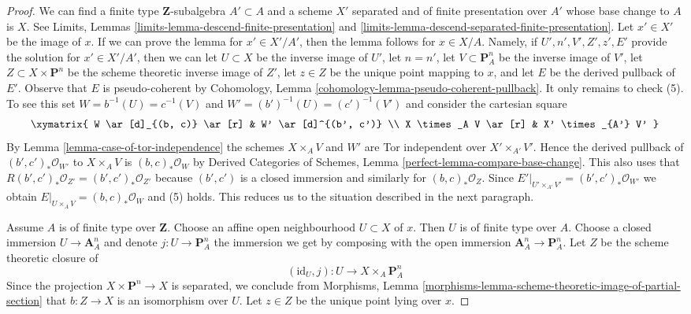\begin{proof}
We can find a finite type $\mathbf{Z}$-subalgebra $A' \subset A$
and a scheme $X'$ separated and of finite presentation over $A'$
whose base change to $A$ is $X$. See
Limits, Lemmas \ref{limits-lemma-descend-finite-presentation} and
\ref{limits-lemma-descend-separated-finite-presentation}.
Let $x' \in X'$ be the image of $x$.
If we can prove the lemma for $x' \in X'/A'$, then
the lemma follows for $x \in X/A$.
Namely, if $U', n', V', Z', z', E'$ provide the solution
for $x' \in X'/A'$, then we can let
$U \subset X$ be the inverse image of $U'$,
let $n = n'$,
let $V \subset \mathbf{P}^n_A$ be the inverse image of $V'$,
let $Z \subset X \times \mathbf{P}^n$ be
the scheme theoretic inverse image of $Z'$,
let $z \in Z$ be the unique point mapping to $x$, and
let $E$ be the derived pullback of $E'$.
Observe that $E$ is pseudo-coherent by
Cohomology, Lemma \ref{cohomology-lemma-pseudo-coherent-pullback}.
It only remains to check (5). To see this
set $W = b^{-1}(U) = c^{-1}(V)$ and $W' = (b')^{-1}(U) = (c')^{-1}(V')$ 
and consider the cartesian square
$$
\xymatrix{
W \ar[d]_{(b, c)} \ar[r] & W' \ar[d]^{(b', c')} \\
X \times_A V \ar[r] & X' \times_{A'} V'
}
$$
By Lemma \ref{lemma-case-of-tor-independence} the schemes
$X \times_A V$ and $W'$ are Tor independent over $X' \times_{A'} V'$.
Hence the derived pullback of
$(b', c')_*\mathcal{O}_{W'}$ to $X \times_A V$
is $(b, c)_*\mathcal{O}_W$ by
Derived Categories of Schemes,
Lemma \ref{perfect-lemma-compare-base-change}.
This also uses that $R(b', c')_*\mathcal{O}_{Z'} = (b', c')_*\mathcal{O}_{Z'}$
because $(b', c')$ is a closed immersion and similarly for
$(b, c)_*\mathcal{O}_Z$.
Since $E'|_{U' \times_{A'} V'} =
(b', c')_*\mathcal{O}_{W'}$ we obtain
$E|_{U \times_A V} = (b, c)_*\mathcal{O}_W$
and (5) holds.
This reduces us to the situation described in the next
paragraph.

\medskip\noindent
Assume $A$ is of finite type over $\mathbf{Z}$.
Choose an affine open neighbourhood $U \subset X$ of $x$.
Then $U$ is of finite type over $A$.
Choose a closed immersion $U \to \mathbf{A}^n_A$ and denote
$j : U \to \mathbf{P}^n_A$ the immersion we get by composing
with the open immersion $\mathbf{A}^n_A \to \mathbf{P}^n_A$.
Let $Z$ be the scheme theoretic closure of
$$
(\text{id}_U, j) : U \longrightarrow X \times_A \mathbf{P}^n_A
$$
Since the projection $X \times \mathbf{P}^n \to X$ is separated,
we conclude from Morphisms, Lemma
\ref{morphisms-lemma-scheme-theoretic-image-of-partial-section}
that $b : Z \to X$ is an isomorphism over $U$.
Let $z \in Z$ be the unique point lying over $x$.


\end{proof}
